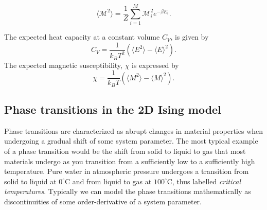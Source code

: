 \documentclass[a4paper]{article}
\begin{document}
  \begin{equation}
    \langle \mathcal{M}^2\rangle=\frac{1}{Z}\sum_{i=1}^M\mathcal{M}_i^2e^{-\beta E_i}.
\end{equation}
    
    


The expected heat capacity at a constant volume $C_V$,  is given by
\begin{equation}
    C_V = \frac{1}{k_BT^2}\left( \langle E^2\rangle - \langle E \rangle^2\right). \label{eq:Cv}
\end{equation}
The expected magnetic susceptibility, $\chi$ is expressed by
\begin{equation}
    \chi = \frac{1}{k_BT}\left( \langle M^2 \rangle - \langle M \rangle^2 \right). \label{eq:chi}
\end{equation}



\subsection{Phase transitions in the 2D Ising model}
Phase transitions are characterized as abrupt changes in material properties when undergoing a gradual shift of some system parameter. The most typical example of a phase transition would be the shift from solid to liquid to gas that most materials undergo as you transition from a sufficiently low to a sufficiently high temperature. Pure water in atmospheric pressure undergoes a transition from solid to liquid at $0^{\circ}$C and from liquid to gas at $100^{\circ}$C, thus labelled \textit{critical temperatures}. Typically we can model the phase transitions mathematically as discontinuities of some order-derivative of a system parameter. 



\end{document}
